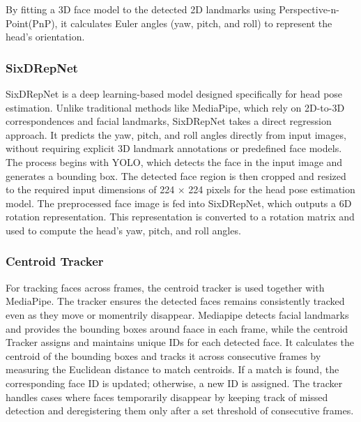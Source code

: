 \documentclass{CSSRforAfrica}
\begin{document}
By fitting a 3D face model to the detected 2D landmarks using Perspective-n-Point(PnP), it calculates Euler angles (yaw, pitch, and roll) to represent the head’s orientation. 

\subsubsection*{SixDRepNet}
SixDRepNet is a deep learning-based model designed specifically for head pose estimation. Unlike traditional methods like MediaPipe, which rely on 2D-to-3D correspondences and facial landmarks, SixDRepNet takes a direct regression approach. It predicts the yaw, pitch, and roll angles directly from input images, without requiring explicit 3D landmark annotations or predefined face models. The process begins with YOLO, which detects the face in the input image and generates a bounding box. The detected face region is then cropped and resized to the required input dimensions of 224 × 224 pixels for the head pose estimation model. The preprocessed face image is fed into SixDRepNet, which outputs a 6D rotation representation. This representation is converted to a rotation matrix and used to compute the head’s yaw, pitch, and roll angles.

\subsubsection*{Centroid Tracker}
For tracking faces across frames, the centroid tracker is used together with MediaPipe. The tracker ensures the detected faces remains consistently tracked even as they move or momentrily disappear. Mediapipe detects facial landmarks and provides the bounding boxes around faace in each frame, while the centroid Tracker assigns and maintains unique IDs for each detected face. It calculates the centroid of the bounding boxes and tracks it across consecutive frames by measuring the Euclidean distance to match centroids. If a match is found, the corresponding face ID is updated; otherwise, a new ID is assigned. The tracker handles cases where faces temporarily disappear by keeping track of missed detection and deregistering them only after a set threshold of consecutive frames.

\newpage
\end{document}
